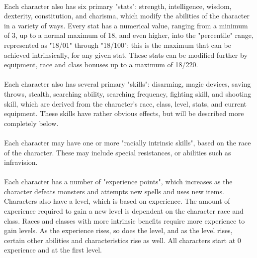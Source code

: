 \paragraph{}
Each character also has six primary "stats": strength, intelligence,
wisdom, dexterity, constitution, and charisma, which modify the
abilities of the character in a variety of ways. Every stat has a
numerical value, ranging from a minimum of 3, up to a normal maximum of
18, and even higher, into the "percentile" range, represented as "18/01"
through "18/100": this is the maximum that can be achieved
intrinsically, for any given stat. These stats can be modified further
by equipment, race and class bonuses up to a maximum of 18/220.

\paragraph{}
Each character also has several primary "skills": disarming, magic
devices, saving throws, stealth, searching ability, searching frequency,
fighting skill, and shooting skill, which are derived from the
character's race, class, level, stats, and current equipment. These
skills have rather obvious effects, but will be described more
completely below.

\paragraph{}
Each character may have one or more "racially intrinsic skills", based
on the race of the character. These may include special resistances, or
abilities such as infravision.

\paragraph{}
Each character has a number of "experience points", which increases as
the character defeats monsters and attempts new spells and uses new
items. Characters also have a level, which is based on experience. The
amount of experience required to gain a new level is dependent on the
character race and class. Races and classes with more intrinsic
benefits require more experience to gain levels. As the experience
rises, so does the level, and as the level rises, certain other
abilities and characteristics rise as well. All characters start at 0
experience and at the first level.

